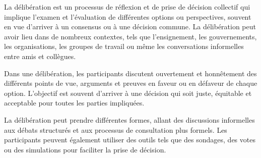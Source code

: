La délibération est un processus de réflexion et de prise de décision collectif qui implique l'examen et l'évaluation de différentes options ou perspectives, souvent en vue d'arriver à un consensus ou à une décision commune. La délibération peut avoir lieu dans de nombreux contextes, tels que l'ensignement, les gouvernements, les organisations, les groupes de travail ou même les conversations informelles entre amis et collègues.

Dans une délibération, les participants discutent ouvertement et honnêtement des différents points de vue, arguments et preuves en faveur ou en défaveur de chaque option. L'objectif est souvent d'arriver à une décision qui soit juste, équitable et acceptable pour toutes les parties impliquées.

La délibération peut prendre différentes formes, allant des discussions informelles aux débats structurés et aux processus de consultation plus formels. Les participants peuvent également utiliser des outils tels que des sondages, des votes ou des simulations pour faciliter la prise de décision.

